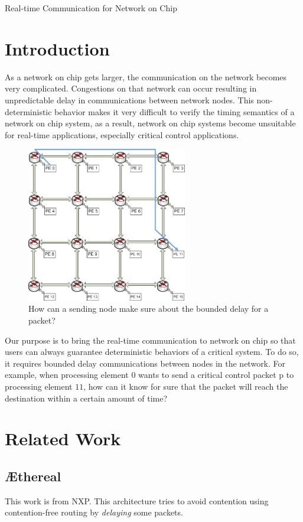 \documentclass[a4]{article}
\begin{document}
\begin{center}
\huge{Real-time Communication for Network on Chip} \hspace{0.5cm}
\end{center}
\section{Introduction}
As a network on chip gets larger, the communication on the network becomes 
very complicated. Congestions on that network can occur resulting in unpredictable 
delay in communications between network nodes. This non-deterministic behavior 
makes it very difficult to verify the timing semantics of a network on chip 
system, as a result, network on chip systems become unsuitable for real-time 
applications, especially critical control applications.

\begin{figure}[htp]
\centering
\includegraphics[width=7cm]{pics/NoC0}
\caption[Demand for a hard real-time flow.]
{How can a sending node make sure about the bounded delay for
a packet?}\label{fig:NoCRt}
\end{figure}

Our purpose is to bring the real-time communication to network on chip so that 
users can always guarantee deterministic behaviors of a critical system. To do 
so, it requires bounded delay communications between nodes in the network. 
For example, when processing element $0$ wants to send a critical control packet 
p to processing element $11$, how can it know for sure that the packet will
reach the destination within a certain amount of time? 

\section{Related Work}
\subsection{\AE thereal}
This work \cite{Goossens_chapter4} is from NXP. This architecture tries to avoid
contention using contention-free routing by {\em delaying} some packets. 
\end{document}
